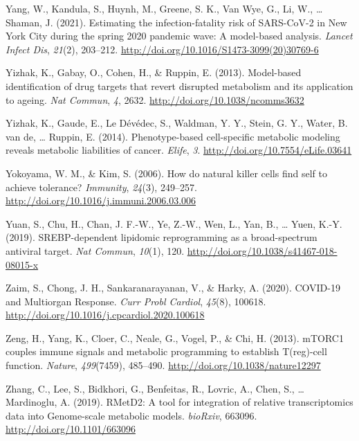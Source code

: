 \documentclass[12pt,twoside,openany,\mydriver]{thesis}  %
\begin{document}
\leavevmode\hypertarget{ref-yang_estimating_2021}{}%
Yang, W., Kandula, S., Huynh, M., Greene, S. K., Van Wye, G., Li, W., \ldots{} Shaman, J. (2021). Estimating the infection-fatality risk of SARS-CoV-2 in New York City during the spring 2020 pandemic wave: A model-based analysis. \emph{Lancet Infect Dis}, \emph{21}(2), 203--212. \url{http://doi.org/10.1016/S1473-3099(20)30769-6}

\leavevmode\hypertarget{ref-yizhak_model-based_2013}{}%
Yizhak, K., Gabay, O., Cohen, H., \& Ruppin, E. (2013). Model-based identification of drug targets that revert disrupted metabolism and its application to ageing. \emph{Nat Commun}, \emph{4}, 2632. \url{http://doi.org/10.1038/ncomms3632}

\leavevmode\hypertarget{ref-yizhak_phenotype-based_2014}{}%
Yizhak, K., Gaude, E., Le Dévédec, S., Waldman, Y. Y., Stein, G. Y., Water, B. van de, \ldots{} Ruppin, E. (2014). Phenotype-based cell-specific metabolic modeling reveals metabolic liabilities of cancer. \emph{Elife}, \emph{3}. \url{http://doi.org/10.7554/eLife.03641}

\leavevmode\hypertarget{ref-yokoyama_how_2006}{}%
Yokoyama, W. M., \& Kim, S. (2006). How do natural killer cells find self to achieve tolerance? \emph{Immunity}, \emph{24}(3), 249--257. \url{http://doi.org/10.1016/j.immuni.2006.03.006}

\leavevmode\hypertarget{ref-yuan_srebp-dependent_2019}{}%
Yuan, S., Chu, H., Chan, J. F.-W., Ye, Z.-W., Wen, L., Yan, B., \ldots{} Yuen, K.-Y. (2019). SREBP-dependent lipidomic reprogramming as a broad-spectrum antiviral target. \emph{Nat Commun}, \emph{10}(1), 120. \url{http://doi.org/10.1038/s41467-018-08015-x}

\leavevmode\hypertarget{ref-zaim_covid-19_2020}{}%
Zaim, S., Chong, J. H., Sankaranarayanan, V., \& Harky, A. (2020). COVID-19 and Multiorgan Response. \emph{Curr Probl Cardiol}, \emph{45}(8), 100618. \url{http://doi.org/10.1016/j.cpcardiol.2020.100618}

\leavevmode\hypertarget{ref-zeng_mtorc1_2013}{}%
Zeng, H., Yang, K., Cloer, C., Neale, G., Vogel, P., \& Chi, H. (2013). mTORC1 couples immune signals and metabolic programming to establish T(reg)-cell function. \emph{Nature}, \emph{499}(7459), 485--490. \url{http://doi.org/10.1038/nature12297}

\leavevmode\hypertarget{ref-zhang_rmetd2_2019}{}%
Zhang, C., Lee, S., Bidkhori, G., Benfeitas, R., Lovric, A., Chen, S., \ldots{} Mardinoglu, A. (2019). RMetD2: A tool for integration of relative transcriptomics data into Genome-scale metabolic models. \emph{bioRxiv}, 663096. \url{http://doi.org/10.1101/663096}
\end{document}
